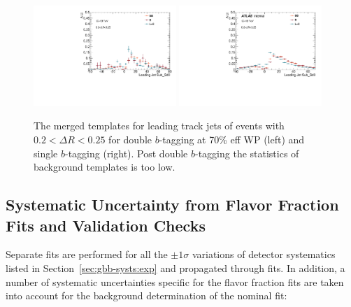 \begin{figure}[htbp]
  \centering
 \includegraphics[width=0.48\textwidth]{figures/gbb/Canv_FitTemplate_medium.pdf}
 \includegraphics[width=0.48\textwidth]{figures/gbb/Sub_Sd0_Fits/Canv_FitTemplate_02-DeltaR-025_LpT_INF_SpT_INF_x.pdf}\\
\caption{The merged \subsdzero templates for leading track jets of events with $0.2<\Delta R<0.25$ for double $b$-tagging at 70\% eff WP (left) and single $b$-tagging (right). Post double $b$-tagging the statistics of background templates is too low.}
 \label{fig:gbb-template-leadtight-medium}
\end{figure}


\subsection{Systematic Uncertainty from Flavor Fraction Fits and Validation Checks}
\label{sec:gbb-sub_systematics}

Separate fits are performed for all the $\pm 1\sigma$ variations of detector systematics listed in Section~\ref{sec:gbb-systs:exp} and propagated through fits. In addition, a number of systematic uncertainties specific for the flavor fraction fits are taken into account for the background determination of the nominal fit:

